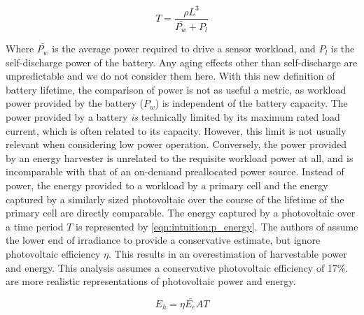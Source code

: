 \begin{equation}
\label{eq:intuition:battery_life}
T = \frac{\rho L^3}{\bar{P_w} + P_l}
\end{equation}

\noindent Where $\bar{P_w}$ is the average power required to drive a sensor workload, and $P_l$ is the self-discharge power of the battery. 
Any aging effects other than self-discharge are unpredictable and we do not consider them here. 
With this new definition of battery lifetime, the comparison of power is not as useful a metric, as workload power provided by the battery ($P_w$) is independent of the battery capacity. 
The power provided by a battery \textit{is} technically limited by its maximum rated load current, which is often related to its capacity. 
However, this limit is not usually relevant when considering low power operation.
Conversely, the power provided by an energy harvester is unrelated to the requisite workload power at all, and is incomparable with that of an on-demand preallocated power source.
Instead of power, the energy provided to a workload by a primary cell and the energy captured by a similarly sized photovoltaic over the course of the lifetime of the primary cell are directly comparable.
The energy captured by a photovoltaic over a time period $T$ is represented by \cref{eqn:intuition:p_energy}.
The authors of \cite{yervaGrafting12} assume the lower end of irradiance to provide a conservative estimate, but ignore photovoltaic efficiency $\eta$. This results in an overestimation of harvestable power and energy.
This analysis assumes a conservative photovoltaic efficiency of 17\%.
 are more realistic representations of photovoltaic power and energy. 

\begin{equation} \label{eqn:intuition:p_energy}
E_h = \eta \bar{E_e} A T 
\end{equation}



